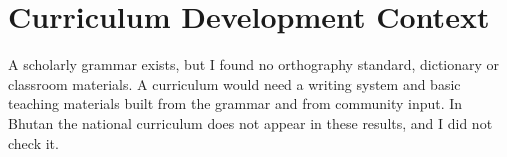 \documentclass[12pt]{article}
\begin{document}
\section{Curriculum Development Context}
A scholarly grammar exists, but I found no orthography standard, dictionary or classroom materials. A curriculum would need a writing system and basic teaching materials built from the grammar and from community input. In Bhutan the national curriculum does not appear in these results, and I did not check it.
\end{document}
